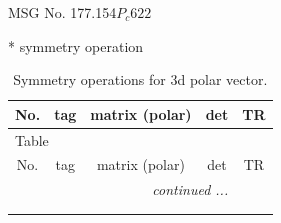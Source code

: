 \documentclass[fleqn,8pt]{jsarticle}
\begin{document}
\setcounter{MaxMatrixCols}{32}

\renewcommand{\tablename}{Table~}
\renewcommand{\figurename}{Figure~}
\begin{center}
\LARGE
MSG No. 177.154\quad$P_{c}622$
\end{center}
* symmetry operation
\renewcommand{\arraystretch}{1.3}
\begin{longtable}{ccccc}
\caption{Symmetry operations for 3d polar vector.}
 \\
 \hline \hline
No. & tag & matrix (polar) & det & TR \\ \hline \endfirsthead

\multicolumn{4}{l}{\tablename\ \thetable{}} \\
 \hline \hline
No. & tag & matrix (polar) & det & TR \\ \hline \endhead

 \hline \hline
\multicolumn{4}{r}{\footnotesize\it continued ...} \\ \endfoot

 \hline \hline
\multicolumn{4}{r}{} \\ \endlastfoot


\end{longtable}
\end{document}
